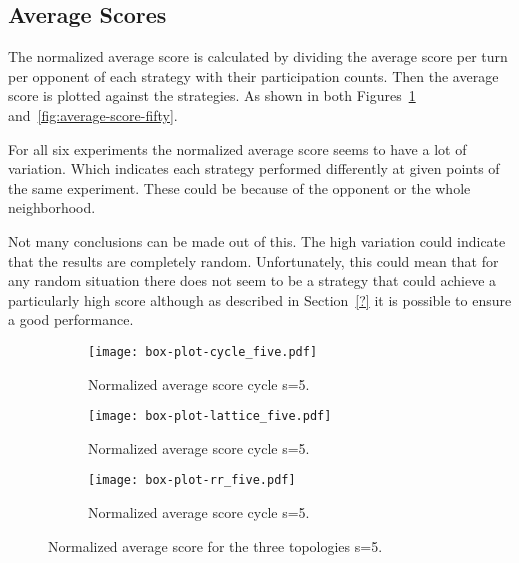 \subsection{Average Scores}

The normalized average score is calculated by dividing the average score per
turn per opponent
of each strategy with their participation counts. Then the average score
is plotted against the strategies. As shown in both
Figures~\ref{fig:average-score-five} and~\ref{fig:average-score-fifty}.

For all six experiments the normalized average score seems to have a lot
of variation. Which indicates each strategy performed differently at given
points of the same experiment. These could be because of the opponent or the
whole neighborhood.

Not many conclusions can be made out of this. The high variation could indicate
that the results are completely random. Unfortunately, this could mean that for
any random situation there does not seem to be a strategy that could
achieve a particularly high score although as described in Section~\ref{?} it is
possible to ensure a good performance.

\begin{figure}[!hbtp]
\centering
    \begin{subfigure}[t]{1\textwidth}
    \centering
        \texttt{[image: box-plot-cycle\_five.pdf]}
    \caption{Normalized average score cycle s=5.}
    \end{subfigure}
\hfill
    \begin{subfigure}[t]{1\textwidth}\centering
    \centering
        \texttt{[image: box-plot-lattice\_five.pdf]}
    \caption{Normalized average score cycle s=5.}
    \end{subfigure}
\hfill
    \begin{subfigure}[t]{1\textwidth}\centering
    \centering
        \texttt{[image: box-plot-rr\_five.pdf]}
    \caption{Normalized average score cycle s=5.}
    \end{subfigure}
\caption{Normalized average score for the three topologies s=5.}
\label{fig:average-score-five}
\end{figure}

